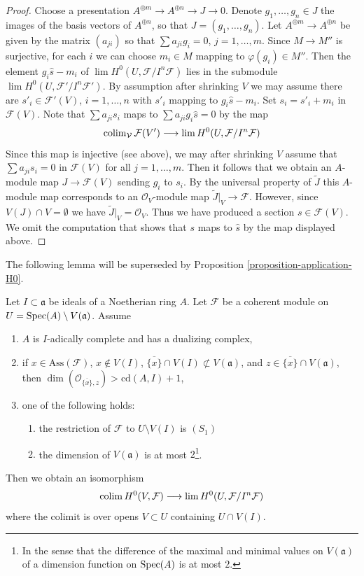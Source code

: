 \begin{proof}
\medskip\noindent
Choose a presentation $A^{\oplus m} \to A^{\oplus n} \to J \to 0$.
Denote $g_1, \ldots, g_n \in J$ the images of the basis vectors
of $A^{\oplus n}$, so that $J = (g_1, \ldots, g_n)$. Let
$A^{\oplus m} \to A^{\oplus n}$ be given by the matrix $(a_{ji})$
so that $\sum a_{ji} g_i = 0$, $j = 1, \ldots, m$.
Since $M \to M''$ is surjective, for each $i$ we can choose $m_i \in M$
mapping to $\varphi(g_i) \in M''$. Then the element $g_i \hat s - m_i$
of $\lim H^0(U, \mathcal{F}/I^n\mathcal{F})$ lies in
the submodule $\lim H^0(U, \mathcal{F}'/I^n\mathcal{F}')$.
By assumption after shrinking $V$ we may assume there are
$s'_i \in \mathcal{F}'(V)$, $i = 1, \ldots, n$
with $s'_i$ mapping to $g_i \hat s - m_i$.
Set $s_i = s'_i + m_i$ in $\mathcal{F}(V)$.
Note that $\sum a_{ji} s_i$ maps to $\sum a_{ji}g_i\hat s = 0$
by the map
$$
\mathop{\mathrm{colim}}\nolimits_\mathcal{V} \mathcal{F}(V')
\longrightarrow
\mathop{\mathrm{lim}}\nolimits H^0(U, \mathcal{F}/I^n\mathcal{F})
$$
Since this map is injective (see above), we may after shrinking $V$ assume
that $\sum a_{ji}s_i = 0$ in $\mathcal{F}(V)$ for all $j = 1, \ldots, m$.
Then it follows that we obtain an $A$-module map $J \to \mathcal{F}(V)$
sending $g_i$ to $s_i$. By the universal property of $\widetilde{J}$
this $A$-module map corresponds to an $\mathcal{O}_V$-module map
$\widetilde{J}|_V \to \mathcal{F}$. However, since $V(J) \cap V = \emptyset$
we have $\widetilde{J}|_V = \mathcal{O}_V$. Thus we have produced
a section $s \in \mathcal{F}(V)$. We omit the computation that
shows that $s$ maps to $\hat s$ by the map displayed above.
\end{proof}

\noindent
The following lemma will be superseded by
Proposition \ref{proposition-application-H0}.

\begin{lemma}
\label{lemma-application-H0-pre}
Let $I \subset \mathfrak a$ be ideals of a Noetherian ring $A$.
Let $\mathcal{F}$ be a coherent module on
$U = \mathop{\mathrm{Spec}}(A) \setminus V(\mathfrak a)$.
Assume
\begin{enumerate}
\item $A$ is $I$-adically complete and has a dualizing complex,
\item if $x \in \text{Ass}(\mathcal{F})$, $x \not \in V(I)$,
$\overline{\{x\}} \cap V(I) \not \subset V(\mathfrak a)$,
and $z \in \overline{\{x\}} \cap V(\mathfrak a)$, then
$\dim(\mathcal{O}_{\overline{\{x\}}, z}) > \text{cd}(A, I) + 1$,
\item one of the following holds:
\begin{enumerate}
\item the restriction of $\mathcal{F}$ to $U \setminus V(I)$ is $(S_1)$
\item the dimension of $V(\mathfrak a)$ is at most $2$\footnote{In
the sense that the difference of the maximal and minimal values
on $V(\mathfrak a)$ of a dimension function on $\mathop{\mathrm{Spec}}(A)$ is at most $2$.}.
\end{enumerate}
\end{enumerate}
Then we obtain an isomorphism
$$
\mathop{\mathrm{colim}}\nolimits H^0(V, \mathcal{F})
\longrightarrow
\mathop{\mathrm{lim}}\nolimits H^0(U, \mathcal{F}/I^n\mathcal{F})
$$
where the colimit is over opens $V \subset U$ containing $U \cap V(I)$.
\end{lemma}

